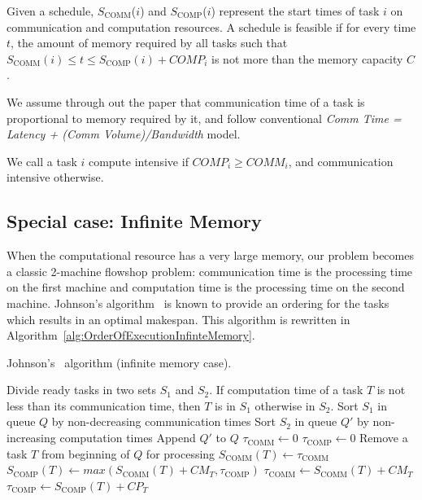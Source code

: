 \documentclass[sigconf]{acmart}
\newcommand{\scomm}{\ensuremath{{S}_{\text{COMM}}}}
\newcommand{\scomp}{\ensuremath{{S}_{\text{COMP}}}}
\begin{document}
	
	Given a schedule, \scomm($i$) and \scomp($i$) represent the
	start times of task $i$ on communication and computation
	resources. A schedule is feasible if for every time $t$, the
	amount of memory required by all tasks such that $\scomm(i) \leq t
	\leq \scomp(i) + COMP_i$ is not more than the memory capacity
	$C$. 

 We assume through out the paper that communication time of a task is proportional to memory required by it, and follow conventional \textit{Comm Time = Latency + (Comm Volume)/Bandwidth} model.
	
	We call a task $i$ compute intensive if $COMP_i \ge COMM_i$, and
	communication intensive otherwise.
	
	\subsection{Special case: Infinite Memory}
	
	When the computational resource has a very large memory, our problem
	becomes a classic 2-machine flowshop problem: communication time is
	the processing time on the first machine and computation time is the
	processing time on the second machine. Johnson's
	algorithm~\cite{johnson} is known to provide an ordering for the tasks
	which results in an optimal makespan. This algorithm is rewritten in
	Algorithm~\ref{alg:OrderOfExecutionInfinteMemory}.
	
	\begin{algorithm}
		\caption{\label{alg:OrderOfExecutionInfinteMemory}Johnson's~\cite{johnson} algorithm (infinite memory case).}
		\begin{algorithmic}[1]
			\STATE Divide ready tasks in two sets $S_1$ and $S_2$. If computation time of a task $T$ is not less than its communication time, then $T$ is in $S_1$ otherwise in $S_2$.
			\STATE Sort $S_1$ in queue $Q$ by non-decreasing communication times
			\STATE Sort $S_2$ in queue $Q'$ by non-increasing computation times
			\STATE Append $Q'$ to $Q$
			\STATE $\tau_{\text{COMM}} \gets 0$ \hfill{}
			\STATE $\tau_{\text{COMP}} \gets 0$\hfill {}
			\STATE Remove a task $T$ from beginning of $Q$ for processing
			\STATE $\scomm(T) \gets \tau_{\text{COMM}}$
			\STATE $\scomp(T) \gets max(\scomm(T) + CM_T, \tau_{\text{COMP}})$
			\STATE $\tau_{\text{COMM}} \gets \scomm(T) + CM_T$
			\STATE $\tau_{\text{COMP}} \gets \scomp(T) + CP_T$
			\ENDWHILE
		\end{algorithmic}
	\end{algorithm}
	
\end{document}
